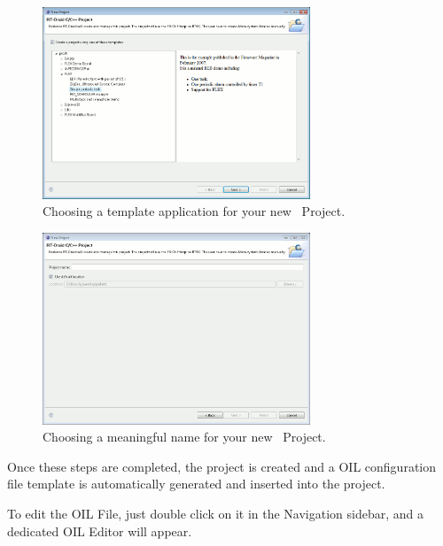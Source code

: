 \begin{figure}
  \begin{center}
    \includegraphics[width=8cm, bb=0 0 943 676]{images/project_template.png}
  \end{center}
  \caption{Choosing a template application for your new \rtd\ Project.}
  \label{fig:rtdruid-project-template}
\end{figure}

\begin{figure}
  \begin{center}
    \includegraphics[width=8cm, bb=0 0 943 676]{images/project_name.png}
  \end{center}
  \caption{Choosing a  meaningful name for your new \rtd\ Project.}
  \label{fig:rtdruid-project-name}
\end{figure}

Once these steps are completed, the project is created and a OIL
configuration file template is automatically generated and inserted
into the project.

To edit the OIL File, just double click on it in the Navigation
sidebar, and a dedicated OIL Editor will appear.






